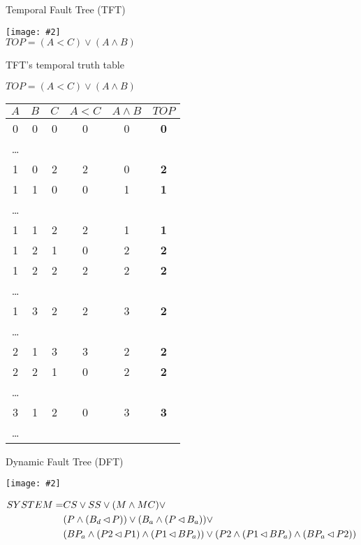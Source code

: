 \documentclass{beamer}
\def\TFT{%
	Temporal Fault Tree (TFT)%
	\gdef\TFT{TFT\xspace}%
	\gdef\TFTs{TFTs\xspace}%
	\xspace%
}
\def\TFTs{%
	Temporal Fault Trees (TFTs)%
	\gdef\TFT{TFT\xspace}%
	\gdef\TFTs{TFTs\xspace}%
	\xspace%
}
\def\DFT{%
	Dynamic Fault Tree (DFT)%
	\gdef\DFT{DFT\xspace}%
	\gdef\DFTs{DFTs\xspace}%
	\xspace%
}
\def\DFTs{%
	Dynamic Fault Trees (DFTs)%
	\gdef\DFT{DFT\xspace}%
	\gdef\DFTs{DFTs\xspace}%
	\xspace%
}
\newcommand{\includegraphicsaspectratio}[2][1]{%
  \texttt{[image: \#2]}%
}
\def\nibefore{\ensuremath\operatorname{\lhd}}
\begin{document}
\begin{frame}{\TFT}
	\begin{center}
		\includegraphicsaspectratio[0.55]{tft-small-example}\\
		$TOP = (A < C) \lor (A \land B)$
	\end{center}
\end{frame}

\begin{frame}{\TFT's temporal truth table}
	\begin{center}
	\scriptsize
		$TOP = (A < C) \lor (A \land B)$\\
		\begin{tabular}{cccccc}
			$A$ & $B$ & $C$ & $A < C$ & $A \land B$ & $TOP$\\
			\hline
			0 & 0 & 0 & 0 & 0 & \textbf{0}\\
			\ldots\\
			1 & 0 & 2 & 2 & 0 & \textbf{2}\\
			1 & 1 & 0 & 0 & 1 & \textbf{1}\\
			\ldots\\
			1 & 1 & 2 & 2 & 1 & \textbf{1}\\
			1 & 2 & 1 & 0 & 2 & \textbf{2}\\
			1 & 2 & 2 & 2 & 2 & \textbf{2}\\
			\ldots\\
			1 & 3 & 2 & 2 & 3 & \textbf{2}\\
			\ldots\\
			2 & 1 & 3 & 3 & 2 & \textbf{2}\\
			2 & 2 & 1 & 0 & 2 & \textbf{2}\\
			\ldots\\
			3 & 1 & 2 & 0 & 3 & \textbf{3}\\
			\ldots\\
			\hline
		\end{tabular}
	\end{center}
\end{frame}

\begin{frame}[fragile]{\DFT}
	\begin{center}
		\scriptsize
		\includegraphicsaspectratio[0.60]{dft-example-mrl2014}
		\begin{align*}
		SYSTEM =& CS \lor SS \lor (M \land MC) \lor \\
			&(P \land (B_d \nibefore P)) \lor (B_a \land (P \nibefore B_a)) \lor \\
			&(BP_a \land (P2 \nibefore P1) \land (P1 \nibefore BP_a)) \lor
			(P2 \land (P1 \nibefore BP_a) \land (BP_a \nibefore P2))
		\end{align*}
	\end{center}
\end{frame}
\end{document}
